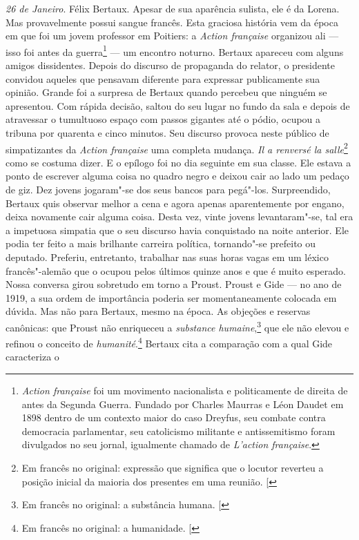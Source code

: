 \emph{26 de Janeiro}. Félix Bertaux. Apesar de sua aparência sulista,
ele é da Lorena. Mas provavelmente possui sangue francês. Esta graciosa
história vem da época em que foi um jovem professor em Poitiers: a
\emph{Action française} organizou ali --- isso foi antes da
guerra\footnote{\emph{Action française} foi um movimento
  nacionalista e politicamente de direita de antes da Segunda Guerra.
  Fundado por Charles Maurras e Léon Daudet em 1898 dentro de um
  contexto maior do caso Dreyfus, seu combate contra democracia
  parlamentar, seu catolicismo militante e antissemitismo foram
  divulgados no seu jornal, igualmente chamado de \emph{L'action
  française}. \versal{[N. E.]}} --- um encontro noturno. Bertaux apareceu com alguns
amigos dissidentes. Depois do discurso de propaganda do relator, o
presidente convidou aqueles que pensavam diferente para expressar
publicamente sua opinião. Grande foi a surpresa de Bertaux quando
percebeu que ninguém se apresentou. Com rápida decisão, saltou do seu
lugar no fundo da sala e depois de atravessar o tumultuoso espaço com
passos gigantes até o pódio, ocupou a tribuna por quarenta e cinco
minutos. Seu discurso provoca neste público de simpatizantes da
\emph{Action française} uma completa mudança. \emph{Il a renversé la
salle}\footnote{Em francês no original: expressão que significa que o locutor reverteu a posição inicial da maioria dos presentes em uma reunião. {[}\versal{N. T.}{]}} como se costuma dizer. E o epílogo foi no dia seguinte em sua
classe. Ele estava a ponto de escrever alguma coisa no quadro negro e
deixou cair ao lado um pedaço de giz. Dez jovens jogaram"-se dos seus
bancos para pegá"-los. Surpreendido, Bertaux quis observar melhor a cena
e agora apenas aparentemente por engano, deixa novamente cair alguma
coisa. Desta vez, vinte jovens levantaram"-se, tal era a impetuosa
simpatia que o seu discurso havia conquistado na noite anterior. Ele
podia ter feito a mais brilhante carreira política, tornando"-se
prefeito ou deputado. Preferiu, entretanto, trabalhar nas suas horas vagas
em um léxico francês"-alemão que o ocupou pelos últimos quinze anos e que
é muito esperado. Nossa conversa girou sobretudo em torno a Proust.
Proust e Gide --- no ano de 1919, a sua ordem de importância poderia ser
momentaneamente colocada em dúvida. Mas não para Bertaux, mesmo na
época. As objeções e reservas canônicas: que Proust não enriqueceu a
\emph{substance humaine},\footnote{Em francês no original: a substância humana. {[}\versal{N. T.}{]}} que ele não elevou e refinou o conceito de
\emph{humanité}.\footnote{Em francês no original: a humanidade. {[}\versal{N. T.}{]}} Bertaux cita a comparação com a qual Gide caracteriza o
